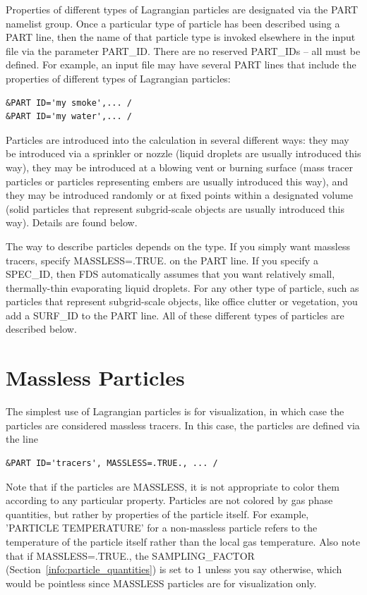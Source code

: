 \documentclass[11pt]{book}
\begin{document}
Properties of different types of
Lagrangian particles are designated via the {\ct PART} namelist group.
Once a particular type of particle has been described using
a {\ct PART} line, then the name of that particle type is invoked
elsewhere in the input file via the parameter {\ct PART\_ID}. There are no reserved {\ct PART\_ID}s -- all must be defined.
For example, an input file may have several {\ct PART} lines that include the
properties of different types of Lagrangian particles:
\begin{lstlisting}
&PART ID='my smoke',... /
&PART ID='my water',... /
\end{lstlisting}
Particles are introduced into the calculation in several different ways: they may be introduced via a sprinkler or nozzle (liquid droplets are usually introduced this way), they may be introduced at a blowing vent or burning surface (mass tracer particles or particles representing embers are usually introduced this way), and they may be introduced randomly or at fixed points within a designated volume (solid particles that represent subgrid-scale objects are usually introduced this way). Details are found below.

The way to describe particles depends on the type.
If you simply want massless tracers, specify {\ct MASSLESS=.TRUE.} on the {\ct PART} line. If you specify a {\ct SPEC\_ID}, then FDS automatically assumes that you want relatively small, thermally-thin evaporating liquid droplets. For any other type of particle, such as particles that represent subgrid-scale objects, like office clutter or vegetation, you add a {\ct SURF\_ID} to the {\ct PART} line. All of these different types of particles are described below.


\section{Massless Particles}
\label{info:MASSLESS}

The simplest use of Lagrangian particles is for visualization, in which case the
particles are considered massless tracers. In this case, the particles are
defined via the line
\begin{lstlisting}
&PART ID='tracers', MASSLESS=.TRUE., ... /
\end{lstlisting}
Note that if the particles are {\ct MASSLESS}, it is not appropriate to color them according to any particular property. Particles are not colored by gas phase quantities, but rather by properties of the particle itself. For example, {\ct 'PARTICLE TEMPERATURE'} for a non-massless particle refers to the temperature of the particle itself rather than the local gas temperature. Also note that if {\ct MASSLESS=.TRUE.}, the {\ct SAMPLING\_FACTOR} (Section~\ref{info:particle_quantities}) is set to 1 unless you say otherwise, which would be pointless
since {\ct MASSLESS} particles are for visualization only.
\end{document}
